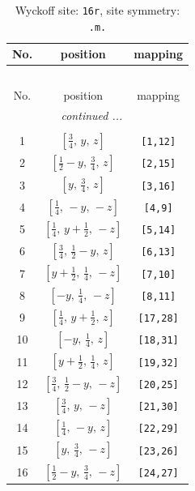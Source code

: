 \documentclass[fleqn,8pt]{jsarticle}
\begin{document}
\renewcommand{\arraystretch}{1.2}
\begin{longtable}{ccc}
\caption{Wyckoff site: {\tt 16r}, site symmetry: {\tt .m.}}
 \\
 \hline \hline
No. & position & mapping \\ \hline \endfirsthead

\multicolumn{2}{l}{\tablename\ \thetable{}} \\
 \hline \hline
No. & position & mapping \\ \hline \endhead

 \hline \hline
\multicolumn{2}{r}{\footnotesize\it continued ...} \\ \endfoot

 \hline \hline
\multicolumn{2}{r}{} \\ \endlastfoot

1 & $\left[ \frac{3}{4},\, y,\, z \right]$ & {\tt [1,12]} \\ \hline
2 & $\left[ \frac{1}{2} - y,\, \frac{3}{4},\, z \right]$ & {\tt [2,15]} \\ \hline
3 & $\left[ y,\, \frac{3}{4},\, z \right]$ & {\tt [3,16]} \\ \hline
4 & $\left[ \frac{1}{4},\, - y,\, - z \right]$ & {\tt [4,9]} \\ \hline
5 & $\left[ \frac{1}{4},\, y + \frac{1}{2},\, - z \right]$ & {\tt [5,14]} \\ \hline
6 & $\left[ \frac{3}{4},\, \frac{1}{2} - y,\, z \right]$ & {\tt [6,13]} \\ \hline
7 & $\left[ y + \frac{1}{2},\, \frac{1}{4},\, - z \right]$ & {\tt [7,10]} \\ \hline
8 & $\left[ - y,\, \frac{1}{4},\, - z \right]$ & {\tt [8,11]} \\ \hline
9 & $\left[ \frac{1}{4},\, y + \frac{1}{2},\, z \right]$ & {\tt [17,28]} \\ \hline
10 & $\left[ - y,\, \frac{1}{4},\, z \right]$ & {\tt [18,31]} \\ \hline
11 & $\left[ y + \frac{1}{2},\, \frac{1}{4},\, z \right]$ & {\tt [19,32]} \\ \hline
12 & $\left[ \frac{3}{4},\, \frac{1}{2} - y,\, - z \right]$ & {\tt [20,25]} \\ \hline
13 & $\left[ \frac{3}{4},\, y,\, - z \right]$ & {\tt [21,30]} \\ \hline
14 & $\left[ \frac{1}{4},\, - y,\, z \right]$ & {\tt [22,29]} \\ \hline
15 & $\left[ y,\, \frac{3}{4},\, - z \right]$ & {\tt [23,26]} \\ \hline
16 & $\left[ \frac{1}{2} - y,\, \frac{3}{4},\, - z \right]$ & {\tt [24,27]} \\
\end{longtable}
\end{document}
